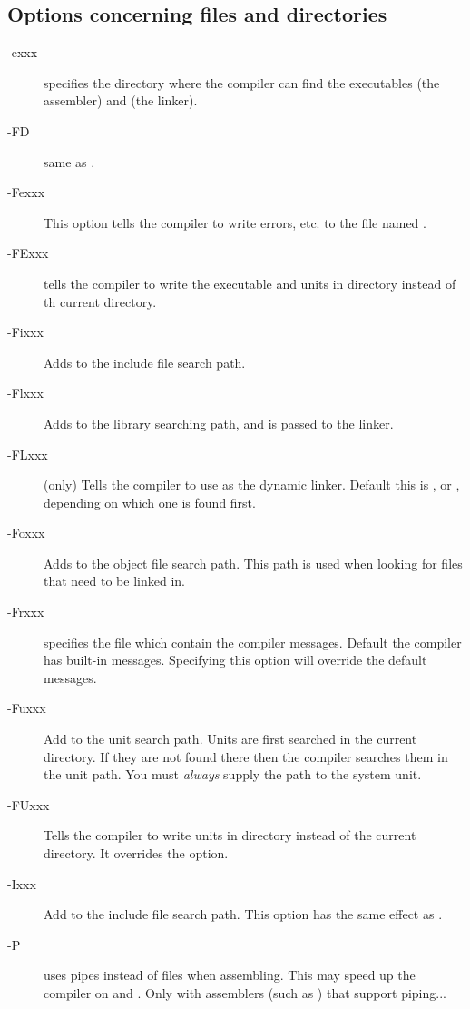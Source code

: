 %
%
\subsection{Options concerning files and directories}
\begin{description}
\item [-exxx]  specifies the directory where the
compiler can find the executables  (the assembler) and 
(the linker).
\item [-FD] same as .
\item [-Fexxx] This option tells the compiler to write errors, etc. to
the file named .
\item [-FExxx] tells the compiler to write the executable and units in
directory  instead of th current directory.
\item [-Fixxx] Adds  to the include file search path.
\item [-Flxxx] Adds  to the library searching path, and is passed
to the linker.
\item[-FLxxx] (\linux only) Tells the compiler to use  as the
dynamic linker. Default this is , or
, depending on which one is found first.
\item[-Foxxx] Adds  to the object file search path.
This path is used when looking for files that need to be linked in.
\item [-Frxxx]  specifies the file which contain the compiler
messages. Default the compiler has built-in messages. Specifying this option
will override the default messages.
\item [-Fuxxx] Add  to the unit search path.
Units are first searched in the current directory.
If they are not found there then the compiler searches them in the unit path.
You must {\em always} supply the path to the system unit.
\item [-FUxxx] Tells the compiler to write units in directory 
instead of the current directory. It overrides the  option.
\item [-Ixxx]  Add  to the include file search path.
This option has the same effect as .
\item [-P] uses pipes instead of files when assembling. This may speed up
the compiler on \ostwo and \linux. Only with assemblers (such as \gnu
{}) that support piping...
\end{description}

